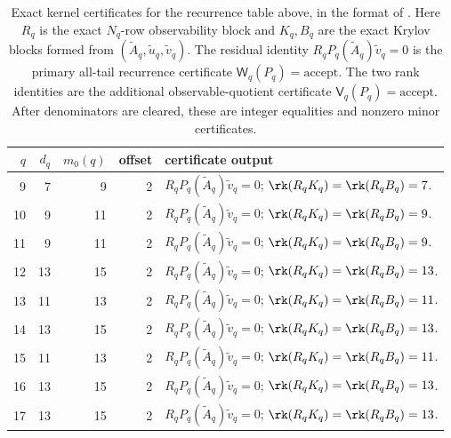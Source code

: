 \begin{table}[t]
\centering
\scriptsize
\setlength{\tabcolsep}{5pt}
\caption{Exact kernel certificates for the recurrence table above, in the
format of .  Here
\(R_q\) is the exact \(N_q\)-row observability block and
\(K_q,B_q\) are the exact Krylov blocks formed from
\((\widetilde A_q,\widetilde u_q,\widetilde v_q)\).  The residual identity
\(R_qP_q(\widetilde A_q)\widetilde v_q=0\) is the primary all-tail recurrence
certificate \(\mathsf W_q(P_q)=\mathrm{accept}\).  The two rank identities are
the additional observable-quotient certificate
\(\mathsf V_q(P_q)=\mathrm{accept}\).  After denominators are cleared, these are
integer equalities and nonzero minor certificates.}
\label{tab:appendix-recurrence-cert-normalization}
\begin{tabular}{r r r r p{}}
\toprule
\(q\) & \(d_q\) & \(m_0(q)\) & offset & certificate output\\
\midrule
9  & 7  & 9  & 2 & \(R_qP_q(\widetilde A_q)\widetilde v_q=0\);
  \(\rk(R_qK_q)=\rk(R_qB_q)=7\).\\
10 & 9  & 11 & 2 & \(R_qP_q(\widetilde A_q)\widetilde v_q=0\);
  \(\rk(R_qK_q)=\rk(R_qB_q)=9\).\\
11 & 9  & 11 & 2 & \(R_qP_q(\widetilde A_q)\widetilde v_q=0\);
  \(\rk(R_qK_q)=\rk(R_qB_q)=9\).\\
12 & 13 & 15 & 2 & \(R_qP_q(\widetilde A_q)\widetilde v_q=0\);
  \(\rk(R_qK_q)=\rk(R_qB_q)=13\).\\
13 & 11 & 13 & 2 & \(R_qP_q(\widetilde A_q)\widetilde v_q=0\);
  \(\rk(R_qK_q)=\rk(R_qB_q)=11\).\\
14 & 13 & 15 & 2 & \(R_qP_q(\widetilde A_q)\widetilde v_q=0\);
  \(\rk(R_qK_q)=\rk(R_qB_q)=13\).\\
15 & 11 & 13 & 2 & \(R_qP_q(\widetilde A_q)\widetilde v_q=0\);
  \(\rk(R_qK_q)=\rk(R_qB_q)=11\).\\
16 & 13 & 15 & 2 & \(R_qP_q(\widetilde A_q)\widetilde v_q=0\);
  \(\rk(R_qK_q)=\rk(R_qB_q)=13\).\\
17 & 13 & 15 & 2 & \(R_qP_q(\widetilde A_q)\widetilde v_q=0\);
  \(\rk(R_qK_q)=\rk(R_qB_q)=13\).\\
\bottomrule
\end{tabular}
\end{table}


